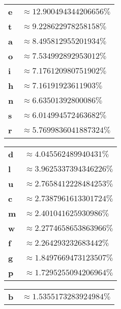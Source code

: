 \documentclass{../sftex/sftex}
\begin{document}
\begin{enumerate}
    \begin{center}
        \begin{minipage}{.32\linewidth}
            \begin{tabular}{>{\bfseries}ll}
                e & $\approx 12.900494344206656\%$     \\
                t & $\approx 9.228622978258158\%$      \\
                a & $\approx 8.495812955201934\%$      \\
                o & $\approx 7.534992892953012\%$      \\
                i & $\approx 7.176120980751902\%$      \\
                h & $\approx 7.16191923611903\%$       \\
                n & $\approx 6.63501392800086\%$       \\
                s & $\approx 6.014994572463682\%$      \\
                r & $\approx 5.7699836041887324\%$     \\
            \end{tabular}
        \end{minipage}
        \begin{minipage}{.33\linewidth}
            \begin{tabular}{>{\bfseries}ll}
                d & $\approx 4.045562489940431\%$      \\
                l & $\approx 3.9625337394346226\%$     \\
                u & $\approx 2.7658412228484253\%$     \\
                c & $\approx 2.7387961613301724\%$     \\
                m & $\approx 2.401041625930986\%$      \\
                w & $\approx 2.2774658653863966\%$     \\
                f & $\approx 2.264293232683442\%$      \\
                g & $\approx 1.8497669473123507\%$     \\
                p & $\approx 1.7295255094206964\%$     \\
            \end{tabular}
        \end{minipage}
        \begin{minipage}{.33\linewidth}
            \begin{tabular}{>{\bfseries}ll}
                b & $\approx 1.5355173283924984\%$     \\

\end{tabular}
\end{minipage}
\end{center}
\end{enumerate}
\end{document}
